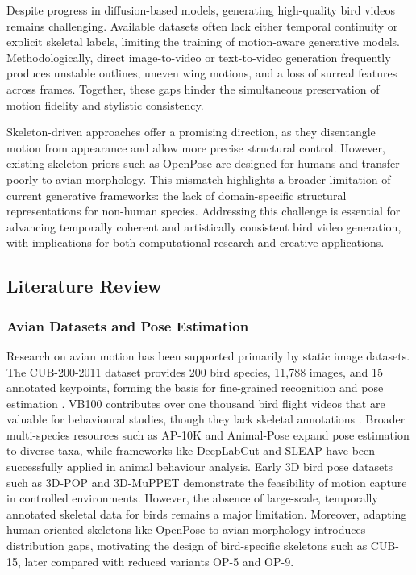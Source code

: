 \documentclass[final-report]{report-template}
\begin{document}
Despite progress in diffusion-based models, generating high-quality bird videos remains challenging. Available datasets often lack either temporal continuity or explicit skeletal labels, limiting the training of motion-aware generative models. Methodologically, direct image-to-video or text-to-video generation frequently produces unstable outlines, uneven wing motions, and a loss of surreal features across frames. Together, these gaps hinder the simultaneous preservation of motion fidelity and stylistic consistency.

Skeleton-driven approaches offer a promising direction, as they disentangle motion from appearance and allow more precise structural control. However, existing skeleton priors such as OpenPose are designed for humans and transfer poorly to avian morphology. This mismatch highlights a broader limitation of current generative frameworks: the lack of domain-specific structural representations for non-human species. Addressing this challenge is essential for advancing temporally coherent and artistically consistent bird video generation, with implications for both computational research and creative applications.



\subsection{Literature Review}
\subsubsection*{Avian Datasets and Pose Estimation}
Research on avian motion has been supported primarily by static image datasets. The CUB-200-2011 dataset provides 200 bird species, 11,788 images, and 15 annotated keypoints, forming the basis for fine-grained recognition and pose estimation \cite{Wah2011CUB200}. 
VB100 contributes over one thousand bird flight videos that are valuable for behavioural studies, though they lack skeletal annotations \cite{Ge2016DICTA,VB100Zenodo}. 
Broader multi-species resources such as AP-10K \cite{Yu2021AP10K} and Animal-Pose \cite{Cao2019AnimalPose} expand pose estimation to diverse taxa, while frameworks like DeepLabCut \cite{Mathis2018DeepLabCut} and SLEAP \cite{Pereira2020SLEAP} have been successfully applied in animal behaviour analysis. 
Early 3D bird pose datasets such as 3D-POP \cite{Naik2023POP} and 3D-MuPPET \cite{Waldmann2024MuPPET} demonstrate the feasibility of motion capture in controlled environments. 
However, the absence of large-scale, temporally annotated skeletal data for birds remains a major limitation. Moreover, adapting human-oriented skeletons like OpenPose \cite{Cao2017PAF} to avian morphology introduces distribution gaps, motivating the design of bird-specific skeletons such as CUB-15, later compared with reduced variants OP-5 and OP-9.
\end{document}
